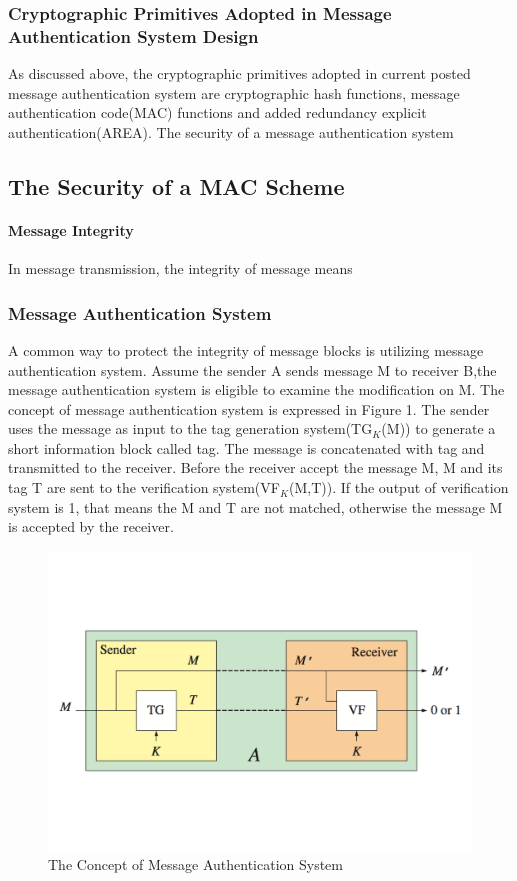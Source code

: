 \documentclass{article}
\begin{document}
\subsubsection{Cryptographic Primitives Adopted in Message Authentication System Design}

As discussed above, the cryptographic primitives adopted in current posted message authentication system are cryptographic hash functions, message authentication code(MAC) functions and added redundancy explicit authentication(AREA). The security of a message authentication system 

\subsection{The Security of a MAC Scheme}
\paragraph{Message Integrity}
In message transmission, the integrity of message means 
\subsubsection{Message Authentication System}
A common way to protect the integrity of message blocks is utilizing message authentication system. Assume the sender A sends message M to receiver B,the message authentication system is eligible to examine the modification on M. The concept of message authentication system is expressed in Figure 1. The sender uses the message as input to the tag generation system(TG$_K$(M)) to generate a short information block called tag. The message is concatenated with tag and transmitted to the receiver. Before the receiver accept the message M, M and its tag T are sent to the verification system(VF$_K$(M,T)). If the output of verification system is 1, that means the M and T are not matched, otherwise the message M is accepted by the receiver. 
\begin{figure}[htbp]
\centering
\includegraphics[scale=0.4]{./diagrams/ma.pdf}
\caption{The Concept of Message Authentication System}
\label{fig:1 }
\end{figure}
\end{document}
